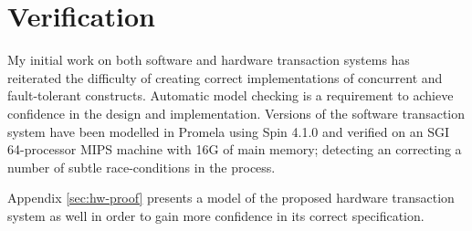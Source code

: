 \section{Verification}
My initial work on both software and hardware transaction systems has
reiterated the difficulty of creating correct implementations of
concurrent and fault-tolerant constructs.  Automatic model checking is
a requirement to achieve confidence in the design and implementation.
Versions of the software transaction system have been modelled in
Promela using Spin 4.1.0 and verified on an SGI 64-processor MIPS
machine with 16G of main memory; detecting an correcting a number of
subtle race-conditions in the process.  

Appendix \ref{sec:hw-proof}
presents a model of
the proposed hardware transaction system as well in order to gain more
confidence in its correct specification.

